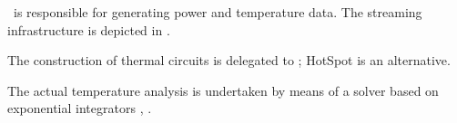 
\streamer\ is responsible for generating power and temperature data. The
streaming infrastructure is depicted in .

The construction of thermal circuits is delegated to 
\cite{sridhar2010}; HotSpot \cite{skadron2004} is an alternative.

The actual temperature analysis is undertaken by means of a solver based on
exponential integrators \cite{hochbruck2010}, \cite{ukhov2012}.
